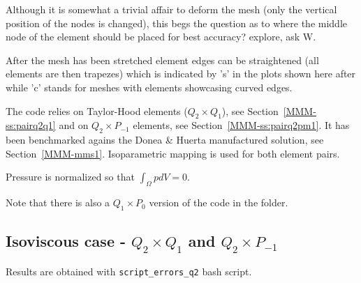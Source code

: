 Although it is somewhat a trivial affair to deform the mesh (only the vertical 
position of the nodes is changed), this begs the question as to where the middle node
of the element should be placed for best accuracy? {\color{red} explore, ask W}.

After the mesh has been stretched element edges can be straightened 
(all elements are then trapezes) which is indicated by 's' in the plots 
shown here after while 'c' stands for meshes with elements showcasing curved edges.

The code relies on Taylor-Hood elements ($Q_2\times Q_1$), see Section~\ref{MMM-ss:pairq2q1} and 
on $Q_2\times P_{-1}$ elements, see Section~\ref{MMM-ss:pairq2pm1}. 
It has been  benchmarked agains the Donea \& Huerta manufactured solution, see Section~\ref{MMM-mms1}.
Isoparametric mapping is used for both element pairs.

Pressure is normalized so that $\int_\Omega p dV= 0$.


Note that there is also a $Q_1\times P_0$ version of the code in the folder.

\newpage
\subsection*{Isoviscous case - $Q_2\times Q_1$ and $Q_2\times P_{-1}$}

Results are obtained with {\tt script\_errors\_q2} bash script.


